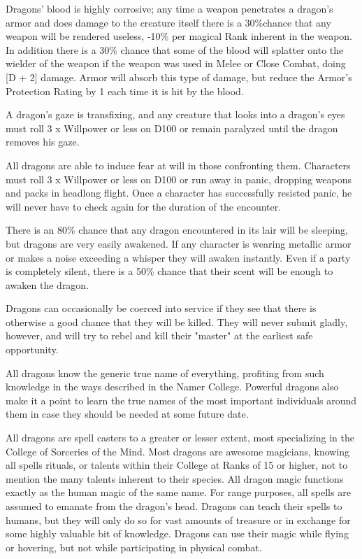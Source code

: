 \begin{multicols*}{2}
Dragons' blood is highly corrosive; any time a weapon penetrates a
dragon's armor and does damage to the creature itself there is a 30\%chance that any weapon will be rendered useless, -10\% per magical Rank
inherent in the weapon.  In addition there is a 30\% chance that some
of the blood will splatter onto the wielder of the weapon if the
weapon was used in Melee or Close Combat, doing [D + 2] damage.  Armor
will absorb this type of damage, but reduce the Armor's Protection
Rating by 1 each time it is hit by the blood.

A dragon's gaze is transfixing, and any creature that looks into a
dragon's eyes must roll 3 x Willpower or less on D100 or remain
paralyzed until the dragon removes his gaze.

All dragons are able to induce fear at will in those confronting
them. Characters must roll 3 x Willpower or less on D100 or run away
in panic, dropping weapons and packs in headlong flight.  Once a
character has successfully resisted panic, he will never have to check
again for the duration of the encounter.

There is an 80\% chance that any dragon encountered in its lair will be
sleeping, but dragons are very easily awakened.  If any character is
wearing metallic armor or makes a noise exceeding a whisper they will
awaken instantly.  Even if a party is completely silent, there is a
50\% chance that their scent will be enough to awaken the dragon.

Dragons can occasionally be coerced into service if they see that
there is otherwise a good chance that they will be killed.  They will
never submit gladly, however, and will try to rebel and kill their
"master" at the earliest safe opportunity.

All dragons know the generic true name of everything, profiting from
such knowledge in the ways described in the Namer College. Powerful
dragons also make it a point to learn the true names of the most
important individuals around them in case they should be needed at
some future date.

All dragons are spell casters to a greater or lesser extent, most
specializing in the College of Sorceries of the Mind.  Most dragons
are awesome magicians, knowing all spells rituals, or talents within
their College at Ranks of 15 or higher, not to mention the many
talents inherent to their species.  All dragon magic functions exactly
as the human magic of the same name.  For range purposes, all spells
are assumed to emanate from the dragon's head.  Dragons can teach
their spells to humans, but they will only do so for vast amounts of
treasure or in exchange for some highly valuable bit of knowledge.
Dragons can use their magic while flying or hovering, but not while
participating in physical combat.


\end{multicols*}
